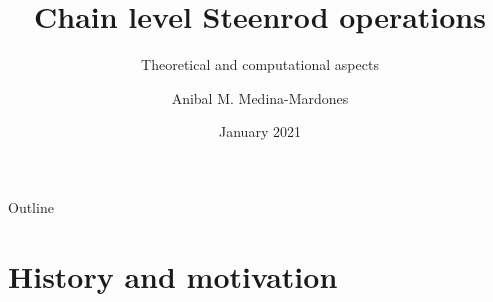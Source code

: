 \documentclass[10pt,t]{beamer}
\title[clesto]{Chain level Steenrod operations}
\subtitle{Theoretical and computational aspects}
\author[ammedmar]{Anibal M. Medina-Mardones}
\institute{Max Planck Institute for Mathematics in Bonn}
\date{January 2021}
\begin{document}

{


\begin{frame}
    \titlepage
\end{frame}
}

\begin{frame}{Outline}
	\vskip 2mm
	\hfill	{\large \parbox{.95\textwidth}{\tableofcontents[hideothersubsections]}}
\end{frame}

\section{History and motivation} \label{sec: history and motivation}
\end{document}

